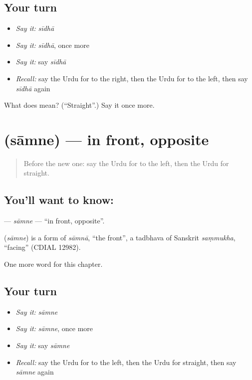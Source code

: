 \subsection*{Your turn}
\begin{itemize}
\raggedright
  \item \emph{Say it:} \emph{sīdhā}
  \item \emph{Say it:} \emph{sīdhā}, once more
  \item \emph{Say it:} say \emph{sīdhā}
  \item \emph{Recall:} say the Urdu for to the right, then the Urdu for to the left, then say \emph{sīdhā} again
\end{itemize}

\begin{tcolorbox}[breakable,colback=teal!4,colframe=teal!35!black,title={Before you move on}]
What does  mean? (\textquotedblleft{}Straight\textquotedblright{}.) Say it once more.
\end{tcolorbox}
\section[\texorpdfstring{\ur{سامنے} (sāmne)}{سامنے (sāmne)}]{ (sāmne) — in front, opposite}

\label{lesson:UR-C97-samne}



\begin{quote}
Before the new one: say the Urdu for to the left, then the Urdu for straight.
\end{quote}

\subsection*{You'll want to know: }
\textbf{} — \emph{sāmne} — \textquotedblleft{}in front, opposite\textquotedblright{}.

\begin{cousinweb}
\textbf{} (\emph{sāmne}) is a form of \emph{sāmnā}, \textquotedblleft{}the front\textquotedblright{}, a tadbhava of Sanskrit \emph{saṃmukha}, \textquotedblleft{}facing\textquotedblright{} (CDIAL 12982).
\end{cousinweb}

\begin{grammarlens}[title={What you've built}]
One more word for this chapter.
\end{grammarlens}

\subsection*{Your turn}
\begin{itemize}
\raggedright
  \item \emph{Say it:} \emph{sāmne}
  \item \emph{Say it:} \emph{sāmne}, once more
  \item \emph{Say it:} say \emph{sāmne}
  \item \emph{Recall:} say the Urdu for to the left, then the Urdu for straight, then say \emph{sāmne} again
\end{itemize}


